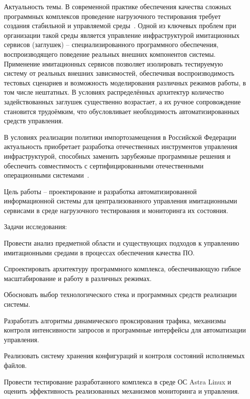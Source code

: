 ﻿\Introduction

Актуальность темы. В современной практике обеспечения качества сложных программных комплексов проведение нагрузочного тестирования требует создания стабильной и управляемой среды~\cite{gost-56920-2024, kulikov-testing}. Одной из ключевых проблем при организации такой среды является управление инфраструктурой имитационных сервисов (заглушек) -- специализированного программного обеспечения, воспроизводящего поведение реальных внешних компонентов системы. Применение имитационных сервисов позволяет изолировать тестируемую систему от реальных внешних зависимостей, обеспечивая воспроизводимость тестовых сценариев и возможность моделирования различных режимов работы, в том числе нештатных. В условиях распределённых архитектур количество задействованных заглушек существенно возрастает, а их ручное сопровождение становится трудоёмким, что обусловливает необходимость автоматизированных средств управления.

В условиях реализации политики импортозамещения в Российской Федерации актуальность приобретает разработка отечественных инструментов управления инфраструктурой, способных заменить зарубежные программные решения и обеспечить совместимость с сертифицированными отечественными операционными системами~\cite{burenin-astra}.

Цель работы -- проектирование и разработка автоматизированной информационной системы для централизованного управления имитационными сервисами в среде нагрузочного тестирования и мониторинга их состояния.

Задачи исследования:
\begin{compactlist}
  \item Провести анализ предметной области и существующих подходов к управлению имитационными средами в процессах обеспечения качества ПО.
  \item Спроектировать архитектуру программного комплекса, обеспечивающую гибкое масштабирование и работу в различных режимах.
  \item Обосновать выбор технологического стека и программных средств реализации системы.
  \item Разработать алгоритмы динамического проксирования трафика, механизмы контроля интенсивности запросов и программные интерфейсы для автоматизации управления.
  \item Реализовать систему хранения конфигураций и контроля состояний исполняемых файлов.
  \item Провести тестирование разработанного комплекса в среде ОС Astra Linux и оценить эффективность реализованных механизмов мониторинга и управления.
\end{compactlist}

